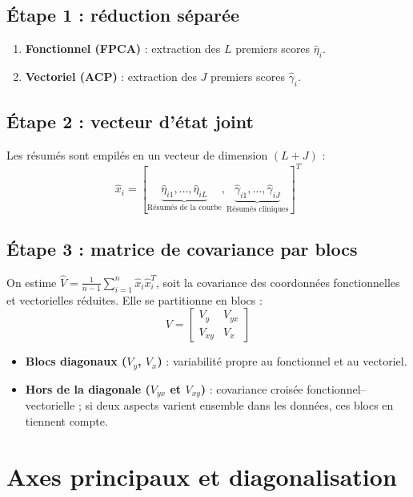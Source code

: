 \documentclass[11pt, a4paper]{article}
\begin{document}
\subsection{Étape 1 : réduction séparée}
\begin{enumerate}
    \item \textbf{Fonctionnel (FPCA)} : extraction des $L$ premiers scores
    $\hat{\eta}_{i}$.
    \item \textbf{Vectoriel (ACP)} : extraction des $J$ premiers scores
    $\hat{\gamma}_{i}$.
\end{enumerate}

\subsection{Étape 2 : vecteur d'état joint}
Les résumés sont empilés en un vecteur de dimension $(L+J)$ :
\begin{equation}
\hat{x}_i = [\underbrace{\hat{\eta}_{i1}, \dots, \hat{\eta}_{iL}}_{\text{Résumés de la courbe}}, \underbrace{\hat{\gamma}_{i1}, \dots, \hat{\gamma}_{iJ}}_{\text{Résumés cliniques}}]^T
\end{equation}

\subsection{Étape 3 : matrice de covariance par blocs}
On estime $\hat{V} = \frac{1}{n-1} \sum_{i=1}^n \hat{x}_i \hat{x}_i^T$, soit la
covariance des coordonnées fonctionnelles et vectorielles réduites. Elle se
partitionne en blocs :
\begin{equation}
V = \begin{bmatrix} V_y & V_{yx} \\ V_{xy} & V_x \end{bmatrix}
\end{equation}

\begin{itemize}
    \item \textbf{Blocs diagonaux ($V_y$, $V_x$)} : variabilité propre au
    fonctionnel et au vectoriel.
    \item \textbf{Hors de la diagonale ($V_{yx}$ et $V_{xy}$)} : covariance
    croisée fonctionnel--vectorielle ; si deux aspects varient ensemble dans
    les données, ces blocs en tiennent compte.
\end{itemize}

\section{Axes principaux et diagonalisation}
\end{document}
